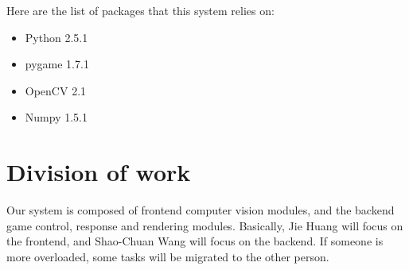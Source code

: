 \documentclass[10pt,twocolumn,letterpaper]{article}
\begin{document}
Here are the list of packages that this system relies on:
\begin{itemize}
	\item Python 2.5.1
	\item pygame 1.7.1
	\item OpenCV 2.1
	\item Numpy 1.5.1
\end{itemize}

\section{Division of work}
Our system is composed of frontend computer vision modules, and the backend 
game control, response and rendering modules. Basically, Jie Huang will focus 
on the frontend, and Shao-Chuan Wang will focus on the backend. If 
someone is more overloaded, some tasks will be migrated to the other 
person.
{\small


}
\end{document}
